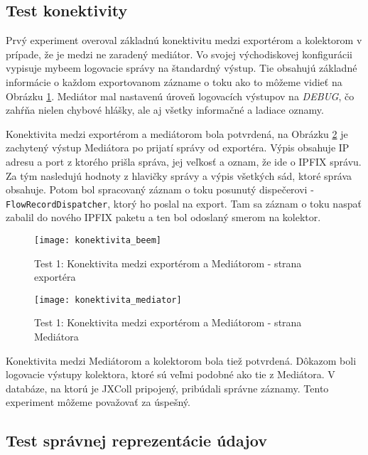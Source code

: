 
\subsection{Test konektivity}

Prvý experiment overoval základnú konektivitu medzi exportérom a kolektorom v prípade, že je medzi ne 
zaradený mediátor. Vo svojej východiskovej konfigurácii vypisuje mybeem logovacie správy na štandardný 
výstup. Tie obsahujú základné informácie o každom exportovanom zázname o toku ako to môžeme vidieť na 
Obrázku \ref{o:konektivita_beem}. Mediátor mal nastavenú úroveň logovacích výstupov na \emph{DEBUG}, 
čo zahŕňa nielen chybové hlášky, ale aj všetky informačné a ladiace oznamy. 

Konektivita medzi exportérom
a mediátorom bola potvrdená, na Obrázku \ref{o:konektivita_mediator} je zachytený výstup Mediátora po 
prijatí správy od exportéra. Výpis obsahuje IP adresu a port z ktorého prišla správa, jej veľkosť a 
oznam, že ide o IPFIX správu. Za tým nasledujú hodnoty z hlavičky správy a výpis všetkých sád, ktoré
správa obsahuje. Potom bol spracovaný záznam o toku posunutý dispečerovi - \verb|FlowRecordDispatcher|, 
ktorý ho poslal na export. Tam sa záznam o toku naspať zabalil do nového IPFIX paketu a ten bol odoslaný 
smerom na kolektor.

\begin{figure}[ht!]
\centering
\texttt{[image: konektivita\_beem]}
\caption{Test 1: Konektivita medzi exportérom a Mediátorom - strana exportéra}\label{o:konektivita_beem}
\end{figure}

\begin{figure}[ht!]
\centering
\texttt{[image: konektivita\_mediator]}
\caption{Test 1: Konektivita medzi exportérom a Mediátorom - strana Mediátora}\label{o:konektivita_mediator}
\end{figure}

Konektivita medzi Mediátorom a kolektorom bola tiež potvrdená. Dôkazom boli logovacie výstupy kolektora, 
ktoré sú veľmi podobné ako tie z Mediátora. V databáze, na ktorú je JXColl pripojený, pribúdali správne 
záznamy. Tento experiment môžeme považovať za úspešný.


\subsection{Test správnej reprezentácie údajov}

